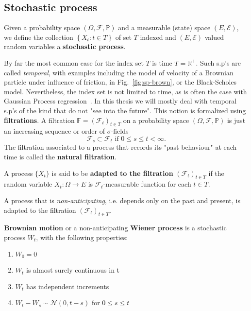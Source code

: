 \subsection{Stochastic process}
\begin{definition}
		Given a probability space $(\Omega, \mathcal{F}, \mathbb{P})$ and a measurable (state) space $(E, \mathcal{E})$, we define the collection $\left\{X_{t}: t \in T\right\}$ of set $T$ indexed and $(E, \mathcal{E})$ valued random variables a \textbf{stochastic process}.
\end{definition}
By far the most common case for the index set $T$ is time $T = \mathbb{R}^+$. Such s.p's are called \emph{temporal}, with examples including the model of velocity of a Brownian particle under influence of friction, in Fig.~\ref{fig:sp-brown}, or the Black-Scholes model. Nevertheless, the index set is not limited to time, as is often the case with Gaussian Process regression~\cite{rasmussen2006gaussian}. In this thesis we will mostly deal with temporal s.p's of the kind that do not "see into the future". This notion is formalized using \textbf{filtrations}. A filtration $\mathbb{F}=\left(\mathcal{F}_{t}\right)_{t \in T}$ on a probability space $(\Omega, \mathcal{F}, \mathbb{P})$ is just an increasing sequence or order of $\sigma$-fields
\begin{equation}
	\mathcal{F}_{s} \subset \mathcal{F}_{t} \text { if } 0 \leq s \leq t<\infty.
\end{equation}
The filtration associated to a process that records its "past behaviour" at each time is called the \textbf{natural filtration}. 
\begin{definition}
	A process $\{X_t\}$ is said to be \textbf{adapted to the filtration} $\left(\mathcal{F}_{t}\right)_{t \in T}$ if the random variable $X_t : \Omega \rightarrow E$ is $\mathcal{F}_t$-measurable function for each $t \in T$. 
\end{definition}
A process that is \emph{non-anticipating}, i.e. depends only on the past and present, is adapted to the filtration $\left(\mathcal{F}_{t}\right)_{t \in T}$.
\begin{definition}
	\textbf{Brownian motion} or a non-anticipating \textbf{Wiener process} is a stochastic process $W_t$, with the following properties:
	\begin{enumerate}[label=\roman*)]
		\item $W_0 = 0$
		\item $W_t$ is almost surely continuous in t
		\item $W_t$ has independent increments
		\item $W_t - W_s \sim \mathcal{N} (0, t-s)$ for $0 \leq s \leq t$
	\end{enumerate}
\end{definition}
